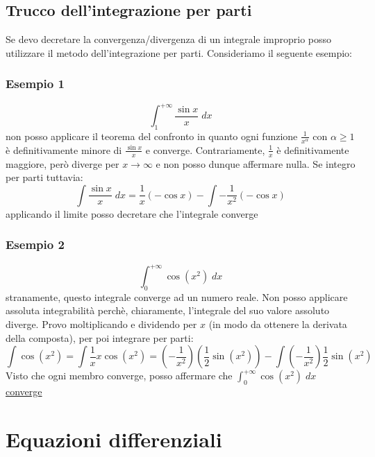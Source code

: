 \subsection{Trucco dell'integrazione per parti}
Se devo decretare la convergenza/divergenza di un integrale improprio posso utilizzare il metodo dell'integrazione per parti. Consideriamo il seguente esempio:
\subsubsection*{Esempio 1}
\[
	\int_{1}^{ + \infty} \frac{\sin x}{x} \; dx
\]
non posso applicare il teorema del confronto in quanto ogni funzione $ \frac{1}{x^{\alpha }} $ con $ \alpha \ge 1 $  è definitivamente minore di $ \frac{\sin x}{x} $ e converge. Contrariamente, $ \frac{1}{x} $ è definitivamente maggiore, però diverge per $ x \to \infty $	e non posso dunque affermare nulla. Se integro per parti tuttavia:
\[
	\int \frac{\sin x}{x} \; dx = \frac{1}{x} \left( - \cos  x \right) - \int -\frac{1}{x^2}\left( -\cos x \right)
\]
applicando il limite posso decretare che l'integrale converge
\subsubsection*{Esempio 2}
\[
	\int_{0}^{+\infty} \cos \left( x^2 \right)  \; dx
\]
stranamente, questo integrale converge ad un numero reale. Non posso applicare assoluta integrabilità perchè, chiaramente, l'integrale del suo valore assoluto diverge. Provo moltiplicando e dividendo per $ x $ (in modo da ottenere la derivata della composta), per poi integrare per parti:
\[
	\int \cos \left( x^2 \right) = \int \frac{1}{x} x \cos \left( x^2 \right) = \left( -\frac{1}{x^2} \right)  \left( \frac{1}{2}\sin \left( x^2 \right) \right)  - \int  \left( -\frac{1}{x^2} \right) \frac{1}{2}\sin \left( x^2 \right)
\]
Visto che ogni membro converge, posso affermare che $ \int_{0}^{+ \infty} \cos \left( x^2 \right)  \; dx $ \underline{converge}

\section{Equazioni differenziali}
